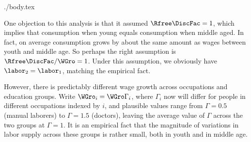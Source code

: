 \documentclass{handout}
\begin{document}
\begin{verbatimwrite}{./body.tex}
{
}{}


One objection to this analysis is that it assumed $\Rfree\DiscFac=1$, which
implies that consumption when young equals consumption when middle
aged.  In fact, on average consumption grows by about the same amount
as wages between youth and middle age.  So perhaps the right
assumption is $\Rfree\DiscFac/\WGro = 1$.  Under this assumption, we obviously
have $\labor_{2}=\labor_{1}$, matching the empirical fact.

However, there is predictably different wage growth across occupations
and education groups.  Write $\WGro_{i}=\WGro\Gamma_{i}$, where $\Gamma_{i}$ now
will differ for people in different occupations indexed by $i$, and plausible values
range from $\Gamma=0.5$ (manual laborers) to $\Gamma=1.5$ (doctors),
leaving the average value of $\Gamma$ across the two groups at $\Gamma=1$.
It is an empirical fact that the magnitude of variations in labor
supply across these groups is rather small, both in youth and in middle age.

\end{verbatimwrite}
\end{document}
